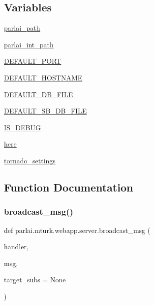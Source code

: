 \subsection*{Variables}
\begin{DoxyCompactItemize}
\item 
\hyperlink{namespaceparlai_1_1mturk_1_1webapp_1_1server_a4655c0f281c309ebedea7bb5c2553a37}{parlai\+\_\+path}
\item 
\hyperlink{namespaceparlai_1_1mturk_1_1webapp_1_1server_a39ddfeedd8f299afd3950be1bb5f0e2a}{parlai\+\_\+int\+\_\+path}
\item 
\hyperlink{namespaceparlai_1_1mturk_1_1webapp_1_1server_ab2dbe49416f69522010b6c9a211af0e3}{D\+E\+F\+A\+U\+L\+T\+\_\+\+P\+O\+RT}
\item 
\hyperlink{namespaceparlai_1_1mturk_1_1webapp_1_1server_a2550c6dcb402e3b6b2f52229e848d6a7}{D\+E\+F\+A\+U\+L\+T\+\_\+\+H\+O\+S\+T\+N\+A\+ME}
\item 
\hyperlink{namespaceparlai_1_1mturk_1_1webapp_1_1server_a7d1b65251987c39df64aeb32f36f6a9f}{D\+E\+F\+A\+U\+L\+T\+\_\+\+D\+B\+\_\+\+F\+I\+LE}
\item 
\hyperlink{namespaceparlai_1_1mturk_1_1webapp_1_1server_a1e2912cd1c7a432b62f8871c8c26ffeb}{D\+E\+F\+A\+U\+L\+T\+\_\+\+S\+B\+\_\+\+D\+B\+\_\+\+F\+I\+LE}
\item 
\hyperlink{namespaceparlai_1_1mturk_1_1webapp_1_1server_a14a39cf63e8f3578e7c5f56f4482c679}{I\+S\+\_\+\+D\+E\+B\+UG}
\item 
\hyperlink{namespaceparlai_1_1mturk_1_1webapp_1_1server_a3cd1097e113507291bebff8bccaf3e6f}{here}
\item 
\hyperlink{namespaceparlai_1_1mturk_1_1webapp_1_1server_a68ebf686092c5adab8c84111b8723ae5}{tornado\+\_\+settings}
\end{DoxyCompactItemize}


\subsection{Function Documentation}
\mbox{\label{namespaceparlai_1_1mturk_1_1webapp_1_1server_aff248adb38d13b62a05e7d5649321d64}} 
\subsubsection{\texorpdfstring{broadcast\+\_\+msg()}{broadcast\_msg()}}
{\footnotesize\ttfamily def parlai.\+mturk.\+webapp.\+server.\+broadcast\+\_\+msg (\begin{DoxyParamCaption}\item[{}]{handler,  }\item[{}]{msg,  }\item[{}]{target\+\_\+subs = {\ttfamily None} }\end{DoxyParamCaption})}



